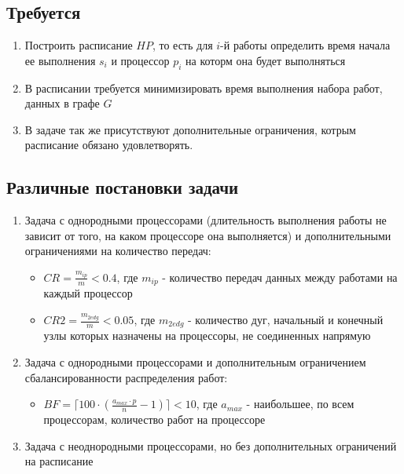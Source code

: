 \subsection*{Требуется}
\begin{enumerate}
    \item Построить расписание $HP$, то есть для $i$-й работы определить время начала ее выполнения $s_i$ и процессор $p_i$ на которм она будет выполняться
    \item В расписании требуется минимизировать время выполнения набора работ, данных в графе $G$
    \item В задаче так же присутствуют дополнительные ограничения, котрым расписание обязано удовлетворять.
\end{enumerate}
\subsection*{Различные постановки задачи}
\begin{enumerate}
    \item Задача с однородными процессорами (длительность выполнения работы не зависит от того, на каком процессоре она выполняется) и дополнительными ограничениями на количество передач:
          \begin{itemize}
              \item $CR = \frac{m_{ip}}{m} < 0.4$, где $m_{ip}$ - количество передач данных между работами на каждый процессор
              \item $CR2 = \frac{m_{2edg}}{m} < 0.05$, где $m_{2edg}$ - количество дуг, начальный и конечный узлы которых назначены на процессоры, не соединенных напрямую
          \end{itemize}
    \item Задача с однородными процессорами и дополнительным ограничением сбалансированности распределения работ:
          \begin{itemize}
              \item $BF = \lceil 100 \cdot \left( \frac{a_{max} \cdot p}{n} - 1 \right) \rceil < 10$, где $a_{max}$ - наибольшее, по всем процессорам, количество работ на процессоре
          \end{itemize}
    \item Задача с неоднородными процессорами, но без дополнительных ограничений на расписание
\end{enumerate}